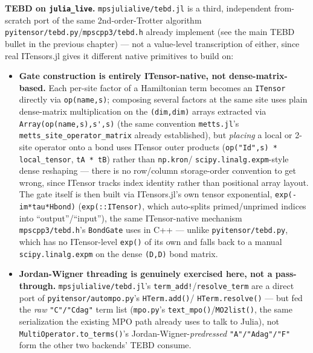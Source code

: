 \documentclass[11pt]{article}
\begin{document}
\textbf{TEBD on \lstinline|julia_live|.} \texttt{mpsjulialive/tebd.jl} is
a third, independent from-scratch port of the same 2nd-order-Trotter
algorithm \texttt{pyitensor/tebd.py}/\texttt{mpscpp3/tebd.h} already
implement (see the main TEBD bullet in the previous chapter) --- not a
value-level transcription of either, since real ITensors.jl gives it
different native primitives to build on:

\begin{itemize}
  \item \textbf{Gate construction is entirely ITensor-native, not
    dense-matrix-based.} Each per-site factor of a Hamiltonian term
    becomes an \lstinline|ITensor| directly via \lstinline|op(name,s)|;
    composing several factors at the same site uses plain dense-matrix
    multiplication on the \lstinline|(dim,dim)| arrays extracted via
    \lstinline|Array(op(name,s),s',s)| (the same convention
    \texttt{metts.jl}'s \lstinline|metts_site_operator_matrix| already
    established), but \emph{placing} a local or 2-site operator onto a
    bond uses ITensor outer products (\lstinline|op("Id",s) * local_tensor|,
    \lstinline|tA * tB|) rather than \lstinline|np.kron|/
    \lstinline|scipy.linalg.expm|-style dense reshaping --- there is no
    row/column storage-order convention to get wrong, since ITensor
    tracks index identity rather than positional array layout. The gate
    itself is then built via ITensors.jl's own tensor exponential,
    \lstinline|exp(-im*tau*Hbond)| (\lstinline|exp(::ITensor)|, which
    auto-splits primed/unprimed indices into ``output''/``input''), the
    same ITensor-native mechanism \texttt{mpscpp3/tebd.h}'s
    \lstinline|BondGate| uses in C++ --- unlike \texttt{pyitensor/tebd.py},
    which has no ITensor-level \lstinline|exp()| of its own and falls
    back to a manual \lstinline|scipy.linalg.expm| on the dense
    \lstinline|(D,D)| bond matrix.
  \item \textbf{Jordan-Wigner threading is genuinely exercised here, not
    a pass-through.} \texttt{mpsjulialive/tebd.jl}'s
    \lstinline|term_add!|/\lstinline|resolve_term| are a direct port of
    \texttt{pyitensor/autompo.py}'s \lstinline|HTerm.add()|/
    \lstinline|HTerm.resolve()| --- but fed the \emph{raw}
    \texttt{"C"/"Cdag"} term list (\texttt{mpo.py}'s
    \lstinline|text_mpo()|/\lstinline|MO2list()|, the same serialization
    the existing MPO path already uses to talk to Julia), not
    \lstinline|MultiOperator.to_terms()|'s Jordan-Wigner-\emph{predressed}
    \texttt{"A"/"Adag"/"F"} form the other two backends' TEBD consume.

\end{itemize}
\end{document}

